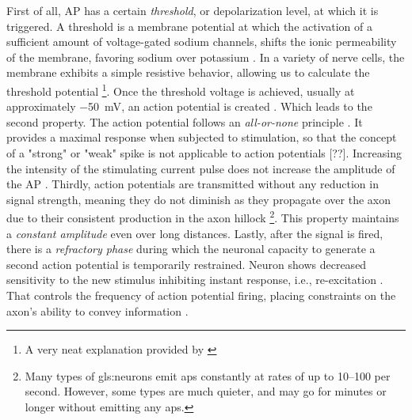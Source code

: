 \documentclass[class={myRUCProject}, crop=false]{standalone}
\begin{document}
First of all, AP has a certain \textit{threshold}, or depolarization level, at which it is triggered. A threshold is a membrane potential at which the activation of a sufficient amount of voltage-gated sodium channels, shifts the ionic permeability of the membrane, favoring sodium over potassium \cite{wood1996neuroscience}. In a variety of nerve cells, the membrane exhibits a simple resistive behavior, allowing us to calculate the threshold potential \footnote{A very neat explanation provided by \cite{kandel2000principles}}. Once the threshold voltage is achieved, usually at approximately {\qty{-50}{\milli\volt}}, an action potential is created \cite{kandel2000principles}. Which leads to the second property. 
The action potential follows an \textit{all-or-none} principle \cite{kandel2000principles}. It provides a maximal response when subjected to stimulation, so that the concept of a "strong" or "weak" spike is not applicable to action potentials [??]. Increasing the intensity of the stimulating current pulse does not increase the amplitude of the AP \cite{hammond2015voltage}.  
Thirdly, action potentials are transmitted without any reduction in signal strength, meaning they do not diminish as they propagate over the axon due to their consistent production in the axon hillock \footnote {Many types of \glspl{gls:neuron} emit \glspl{ap} constantly at rates of up to 10–100 per second. However, some types are much quieter, and may go for minutes or longer without emitting any \glspl{ap}.}. This property maintains a \textit{constant amplitude} even over long distances. 
Lastly, after the signal is fired, there is a \textit{refractory phase} during which the neuronal capacity to generate a second action potential is temporarily restrained. Neuron shows decreased sensitivity to the new stimulus inhibiting instant response, i.e., re-excitation \cite{kandel2000principles}. That controls the frequency of action potential firing, placing constraints on the axon's ability to convey information \cite{kandel2000principles}. 





\end{document}

